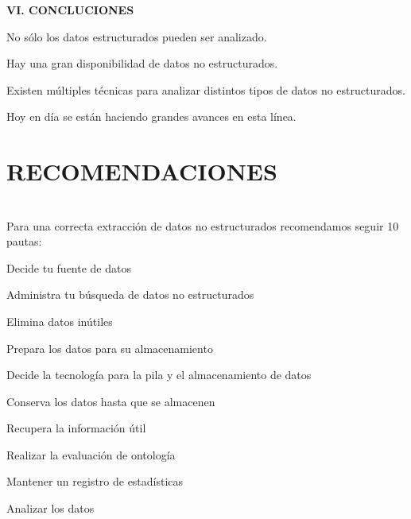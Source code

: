 \documentclass{article} %
\begin{document}
\noindent 

\noindent \textbf{     VI. CONCLUCIONES}

\noindent \textbf{}

\noindent No s\'{o}lo los datos estructurados pueden ser analizado.

\noindent 

\noindent Hay una gran disponibilidad de datos no estructurados.

\noindent 

\noindent Existen m\'{u}ltiples t\'{e}cnicas para analizar distintos tipos de datos no estructurados.

\noindent 

\noindent Hoy en d\'{i}a se est\'{a}n haciendo grandes avances en esta l\'{i}nea.

\noindent 


\section{ RECOMENDACIONES}

\noindent 
\section{}

\noindent 
\section{}

\noindent Para una correcta extracci\'{o}n de datos no estructurados recomendamos seguir 10 pautas:

\noindent 

\noindent Decide tu fuente de datos

\noindent Administra tu b\'{u}squeda de datos no estructurados

\noindent Elimina datos in\'{u}tiles

\noindent Prepara los datos para su almacenamiento

\noindent Decide la tecnolog\'{i}a para la pila y el almacenamiento de datos

\noindent Conserva los datos hasta que se almacenen

\noindent Recupera la informaci\'{o}n \'{u}til

\noindent Realizar la evaluaci\'{o}n de ontolog\'{i}a

\noindent Mantener un registro de estad\'{i}sticas

\noindent Analizar los datos
\end{document}
